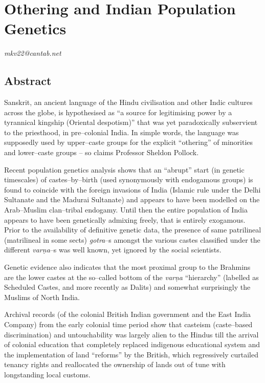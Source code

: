 
\chapter{Othering and Indian Population Genetics}\label{chapter10}


\begin{flushright}
\textit{mkv22@cantab.net}
\end{flushright}


\section*{Abstract}

Sanskrit, an ancient language of the Hindu civilisation and other Indic cultures across the globe, is hypothesised as “a source for legitimising power by a tyrannical kingship (Oriental despotism)” that was yet paradoxically subservient to the priesthood, in pre–colonial India. In simple words, the language was supposedly used by upper–caste groups for the explicit “othering” of minorities and lower–caste groups – so claims Professor Sheldon Pollock.

Recent population genetics analysis shows that an “abrupt” start (in genetic timescales) of castes–by–birth (used synonymously with endogamous groups) is found to coincide with the foreign invasions of India (Islamic rule under the Delhi Sultanate and the Madurai Sultanate) and appears to have been modelled on the Arab–Muslim clan–tribal endogamy. Until then the entire population of India appears to have been genetically admixing freely, that is entirely exogamous. Prior to the availability of definitive genetic data, the presence of same patrilineal (matrilineal in some sects) \textit{gotra}–s amongst the various castes classified under the different \textit{varṇa}–s was well known, yet ignored by the social scientists.

Genetic evidence also indicates that the most proximal group to the Brahmins are the lower castes at the so–called bottom of the \textit{varṇa} “hierarchy” (labelled as Scheduled Castes, and more recently as Dalits) and somewhat surprisingly the Muslims of North India.

Archival records (of the colonial British Indian government and the East India Company) from the early colonial time period show that casteism (caste–based discrimination) and untouchability was largely alien to the Hindus till the arrival of colonial education that completely replaced indigenous educational system and the implementation of land “reforms” by the British, which regressively curtailed tenancy rights and reallocated the ownership of lands out of tune with longstanding local customs.

